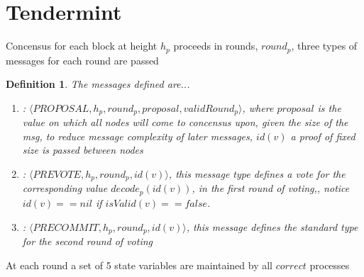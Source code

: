 \documentclass{amsart}
\numberwithin{equation}{section}
\theoremstyle{plain}
\newtheorem{dfn}[thm]{Definition}
\theoremstyle{definition}
\begin{document}
\section{Tendermint}
Concensus for each block at height $h_p$ proceeds in rounds, $round_p$, three types of messages for each round are passed
\begin{dfn} 
  The messages defined are... \\
  \begin{enumerate} 
    \item[(\textbf{Proposal})]: $\langle PROPOSAL, h_p, round_p, proposal, validRound_p \rangle$, where $proposal$ is the value on which all nodes will come to concensus upon, given the size of the msg, to reduce message complexity of later messages, $id(v)$ a proof of fixed size is passed between nodes \\
    \item[(\textbf{Prevote})]: $\langle PREVOTE, h_p, round_p, id(v) \rangle$, this message type defines a vote for the corresponding value $decode_p(id(v))$, in the first round of voting,, notice $id(v) == nil$ if $isValid(v) == false$. \\
    \item[(\textbf{PreCommit})]: $\langle PRECOMMIT, h_p, round_p, id(v) \rangle$, this message defines the standard type for the second round of voting
  \end{enumerate}
\end{dfn}
At each round a set of 5 state variables are maintained by all $correct$ processes
\end{document}

